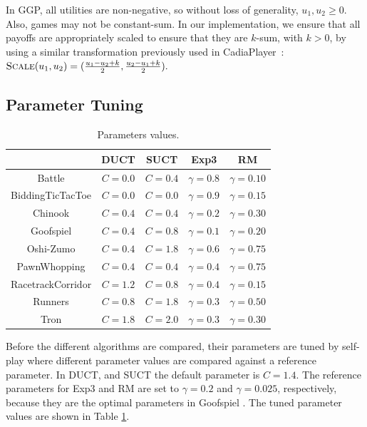 \documentclass[conference]{IEEEtran}
\newcommand{\Cadiaplayer}{{\sc CadiaPlayer}\xspace}
\begin{document}
In GGP, all utilities are non-negative, so without loss of generality, $u_1, u_2 \ge 0$.  
Also, games may not be constant-sum. In our implementation, we ensure that all payoffs 
are appropriately scaled to ensure that they are $k$-sum, with $k > 0$, by using 
a similar transformation previously used in \Cadiaplayer~\cite{Finnsson12}:
$\text{\sc Scale}(u_1, u_2) = (\frac{u_1 - u_2 + k}{2}, \frac{u_2 - u_1 + k}{2}).$

\subsection{Parameter Tuning}

\begin{table}[t!]
\centering
\begin{tabular}{|c|c|c|c|c|}
\hline
                  & DUCT    & SUCT    & Exp3           & RM  \\
\hline
Battle            & $C=0.0$ & $C=0.4$ & $\gamma = 0.8$ & $\gamma = 0.10$  \\ 
BiddingTicTacToe  & $C=0.0$ & $C=0.0$ & $\gamma = 0.9$ & $\gamma = 0.15$   \\ 
Chinook           & $C=0.4$ & $C=0.4$ & $\gamma = 0.2$ & $\gamma = 0.30$ \\ 
Goofspiel         & $C=0.4$ & $C=0.8$ & $\gamma = 0.1$ & $\gamma = 0.20$ \\ 
Oshi-Zumo         & $C=0.4$ & $C=1.8$ & $\gamma = 0.6$ & $\gamma = 0.75$ \\ 
PawnWhopping      & $C=0.4$ & $C=0.4$ & $\gamma = 0.4$ & $\gamma = 0.75$  \\ 
RacetrackCorridor & $C=1.2$ & $C=0.8$ & $\gamma = 0.4$ & $\gamma = 0.15$\\ 
Runners           & $C=0.8$ & $C=1.8$ & $\gamma = 0.3$ & $\gamma = 0.50$ \\
Tron              & $C=1.8$ & $C=2.0$ & $\gamma = 0.3$ & $\gamma = 0.30$ \\
 \hline
\end{tabular}
\caption{Parameters values. \label{tbl:parameters}}
\vspace{-1cm}
\end{table}


Before the different algorithms are compared, their parameters are tuned by self-play where different parameter 
values are compared against a reference parameter. In DUCT, and SUCT the default parameter is $C=1.4$. The reference
parameters for Exp3 and RM are set to $\gamma = 0.2$ and $\gamma = 0.025$, respectively, because they are the optimal 
parameters in Goofspiel \cite{Lanctot13Goofspiel}. The tuned parameter values are shown in Table \ref{tbl:parameters}. 
\end{document}

